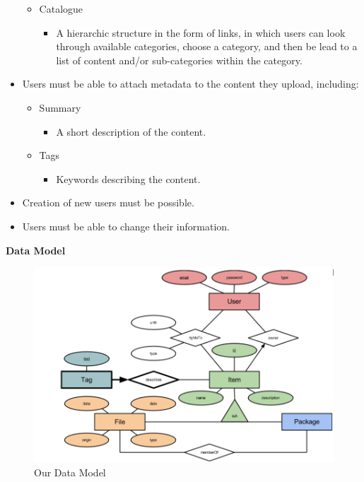 \documentclass[10pt,a4paper]{article}
\begin{document}
\begin{itemize}
\begin{itemize}
\begin{itemize}
\end{itemize}
\item Catalogue
\begin{itemize}
\item A hierarchic structure in the form of links, in which users can look through available categories, choose a category, and then be lead to a list of content and/or sub-categories within the category.
\end{itemize}
\end{itemize}
\item Users must be able to attach metadata to the content they upload, including:
\begin{itemize}
\item Summary
\begin{itemize}
\item A short description of the content.
\end{itemize}
\end{itemize}
\begin{itemize}
\item Tags
\begin{itemize}
\item Keywords describing the content.
\end{itemize}
\end{itemize}
\item Creation of new users must be possible.
\item Users must be able to change their information.
\end{itemize}

{\bfseries Data Model}\\

\begin{figure}
\centering
\includegraphics[width=14cm]{datamodel.png}
\caption{Our Data Model}
\label{dm}
\end{figure}
\newpage
\end{document}

